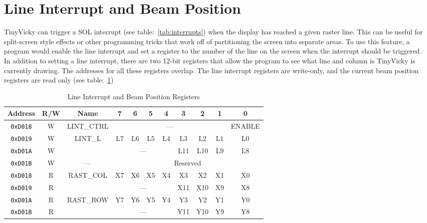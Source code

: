 \section*{Line Interrupt and Beam Position}

TinyVicky can trigger a SOL interrupt (see table:~\ref{tab:interrupts}) when the display has reached a given raster line. This can be useful for split-screen style effects or other programming tricks that work off of partitioning the screen into separate areas. To use this feature, a program would enable the line interrupt and set a register to the number of the line on the screen when the interrupt should be triggered. In addition to setting a line interrupt, there are two 12-bit registers that allow the program to see what line and column is TinyVicky is currently drawing. The addresses for all these registers overlap. The line interrupt registers are write-only, and the current beam position registers are read only (see table:~\ref{tab:lint_reg})

\begin{table}[ht]
    \begin{center}
        \begin{tabular}{|c|c|c|c|c|c|c|c|c|c|c|} \hline
            Address & R/W & Name & 7 & 6 & 5 & 4 & 3 & 2 & 1 & 0 \\\hline\hline
            \verb+0xD018+ & W & LINT\_CTRL & \multicolumn{7}{|c|}{---} & ENABLE \\ \hline
            \verb+0xD019+ & W & \multirow{2}{*}{LINT\_L} & L7 & L6 & L5 & L4 & L3 & L2 & L1 & L0 \\ \cline{1-2}\cline{4-11}
            \verb+0xD01A+ & W &  & \multicolumn{4}{|c|}{---} & L11 & L10 & L9 & L8 \\ \hline
            \verb+0xD01B+ & W & --- & \multicolumn{8}{|c|}{Reserved} \\ \hline

            \verb+0xD018+ & R & \multirow{2}{*}{RAST\_COL} & X7 & X6 & X5 & X4 & X3 & X2 & X1 & X0 \\  \cline{1-2}\cline{4-11}
            \verb+0xD019+ & R & & \multicolumn{4}{|c|}{---} & X11 & X10 & X9 & X8 \\ \hline
            \verb+0xD01A+ & R & \multirow{2}{*}{RAST\_ROW} & Y7 & Y6 & Y5 & Y4 & Y3 & Y2 & Y1 & Y0 \\  \cline{1-2}\cline{4-11}
            \verb+0xD01B+ & R & & \multicolumn{4}{|c|}{---} & Y11 & Y10 & Y9 & Y8 \\ \hline
        \end{tabular}
    \end{center}
    \caption{Line Interrupt and Beam Position Registers}
    \label{tab:lint_reg}
\end{table}

